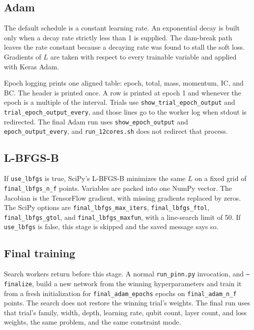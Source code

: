 \documentclass[11pt]{article}
\begin{document}
\subsection{Adam}

The default schedule is a constant learning rate.
An exponential decay is built only when a decay rate strictly less than 1 is supplied.
The dam-break path leaves the rate constant because a decaying rate was found to stall the soft loss.
Gradients of \(L\) are taken with respect to every trainable variable and applied with Keras Adam.

Epoch logging prints one aligned table: epoch, total, mass, momentum, IC, and BC.
The header is printed once.
A row is printed at epoch 1 and whenever the epoch is a multiple of the interval.
Trials use \texttt{show\_trial\_epoch\_output} and \texttt{trial\_epoch\_output\_every}, and those lines go to the worker log when stdout is redirected.
The final Adam run uses \texttt{show\_epoch\_output} and \texttt{epoch\_output\_every}, and \texttt{run\_12cores.sh} does not redirect that process.

\subsection{L-BFGS-B}

If \texttt{use\_lbfgs} is true, SciPy's L-BFGS-B minimizes the same \(L\) on a fixed grid of \texttt{final\_lbfgs\_n\_f} points.
Variables are packed into one NumPy vector.
The Jacobian is the TensorFlow gradient, with missing gradients replaced by zeros.
The SciPy options are \texttt{final\_lbfgs\_max\_iters}, \texttt{final\_lbfgs\_ftol}, \texttt{final\_lbfgs\_gtol}, and \texttt{final\_lbfgs\_maxfun}, with a line-search limit of 50.
If \texttt{use\_lbfgs} is false, this stage is skipped and the saved message says so.

\subsection{Final training}

Search workers return before this stage.
A normal \texttt{run\_pinn.py} invocation, and \texttt{--finalize}, build a new network from the winning hyperparameters and train it from a fresh initialization for \texttt{final\_adam\_epochs} epochs on \texttt{final\_adam\_n\_f} points.
The search does not restore the winning trial's weights.
The final run uses that trial's family, width, depth, learning rate, qubit count, layer count, and loss weights, the same problem, and the same constraint mode.
\end{document}
